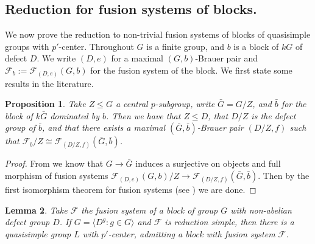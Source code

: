 \documentclass{amsart}
\theoremstyle{plain}\newtheorem{theorem}{Theorem}[section]
\theoremstyle{plain}\newtheorem{conjecture}[theorem]{Conjecture}
\theoremstyle{plain}\newtheorem{corollary}[theorem]{Corollary}
\theoremstyle{plain}\newtheorem{lemma}[theorem]{Lemma}
\theoremstyle{plain}\newtheorem{proposition}[theorem]{Proposition}
\theoremstyle{plain}\newtheorem{statement}[theorem]{}
\theoremstyle{definition}\newtheorem{definition}[theorem]{Definition}
\theoremstyle{definition}\newtheorem{example}[theorem]{Example}
\theoremstyle{definition}\newtheorem{examples}[theorem]{Examples}
\theoremstyle{definition}\newtheorem{notation}[theorem]{Notation}
\theoremstyle{definition}\newtheorem{remark}[theorem]{Remark}
\theoremstyle{definition}\newtheorem{remarks}[theorem]{Remarks}
\theoremstyle{definition}\newtheorem{question}[theorem]{Question}
\theoremstyle{definition}\newtheorem{propositiondefinition}[theorem]{Definition/Proposition}
\begin{document}
 \subsection{Reduction for fusion systems of blocks.}
 We now prove the reduction to non-trivial fusion systems of blocks of quasisimple groups with $p'$-center. Throughout $G$ is a finite group, and $b$ is a block of $kG$ of defect $D$. We write $(D,e)$ for a maximal $(G,b)$-Brauer pair and $\mathcal{F}_b := \mathcal{F}_{(D,e)}(G,b)$ for the fusion system of the block. We first state some results in the literature. 
 \begin{proposition}\label{prop:centralquotient} Take $Z \leq G$ a central $p$-subgroup, write $\bar{G} = G/Z$, and $\bar{b}$ for the block of $k\bar{G}$ dominated by $b$. Then we have that $Z \leq D$, that $D/Z$ is the defect group of $\bar{b}$, and that there exists a maximal $(\bar{G}, \bar{b})$-Brauer pair $(D/Z,f)$ such that $\mathcal{F}_b/Z\cong \mathcal{F}_{(D/Z, f)}(\bar{G}, \bar{b})$.
 \end{proposition}
 \begin{proof} From \cite[Proposition 4.2]{KLR} we know that $G \rightarrow \bar{G}$ induces a surjective on objects and full morphism of fusion systems $\mathcal{F}_{(D,e)}(G,b)/ Z \rightarrow \mathcal{F}_{(D/Z, f)}(\bar{G}, \bar{b})$. Then by the first isomorphism theorem for fusion systems (see \cite[Corollary 5.15]{Craven}) we are done.
 \end{proof}
 \begin{lemma}\label{prop:serwene}\cite[Lemma 3.4]{Serwene}
 Take $\mathcal{F}$ the fusion system of a block of group $G$ with non-abelian defect group $D$. If $G  = \langle D^g: g \in G \rangle$ and $\mathcal{F}$ is reduction simple, then there is a quasisimple group $L$ with $p'$-center, admitting a block with fusion system $\mathcal{F}$.
 \end{lemma}
 
\end{document}
